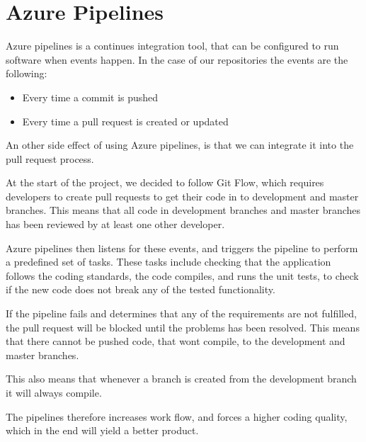 \section{Azure Pipelines}
\label{azurepipelines}
Azure pipelines is a continues integration tool, that can be configured to run software when events happen.
In the case of our repositories the events are the following:
\begin{itemize}
    \item Every time a commit is pushed
    \item Every time a pull request is created or updated
\end{itemize}

An other side effect of using Azure pipelines, is that we can integrate it into the pull request process.

At the start of the project, we decided to follow Git Flow, which requires developers to create pull requests to get their code in to development and master branches.
This means that all code in development branches and master branches has been reviewed by at least one other developer.

Azure pipelines then listens for these events, and triggers the pipeline to perform a predefined set of tasks.
These tasks include checking that the application follows the coding standards, the code compiles, and runs the unit tests, to check if the new code does not break any of the tested functionality. 

If the pipeline fails and determines that any of the requirements are not fulfilled, the pull request will be blocked until the problems has been resolved.
This means that there cannot be pushed code, that wont compile, to the development and master branches.

This also means that whenever a branch is created from the development branch it will always compile.

The pipelines therefore increases work flow, and forces a higher coding quality, which in the end will yield a better product.







